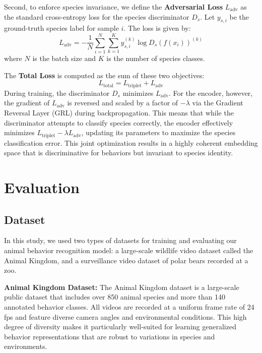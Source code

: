 \documentclass[fleqn,10pt,twocolumn]{AROB}
\begin{document}
Second, to enforce species invariance, we define the \textbf{Adversarial Loss} $L_{\text{adv}}$ as the standard cross-entropy loss for the species discriminator $D_s$.
Let $y_{s,i}$ be the ground-truth species label for sample $i$. The loss is given by:
%
\begin{equation}
L_{\text{adv}} = - \frac{1}{N} \sum_{i=1}^{N} \sum_{k=1}^{K} y_{s,i}^{(k)} \log D_s(f(x_i))^{(k)}
\end{equation}
%
where $N$ is the batch size and $K$ is the number of species classes.

The \textbf{Total Loss} is computed as the sum of these two objectives:
%
\begin{equation}
L_{\text{total}} = L_{\text{triplet}} + L_{\text{adv}}
\end{equation}
%
During training, the discriminator $D_s$ minimizes $L_{\text{adv}}$. For the encoder, however, the gradient of $L_{\text{adv}}$ is reversed and scaled by a factor of $-\lambda$ via the Gradient Reversal Layer (GRL) during backpropagation.
This means that while the discriminator attempts to classify species correctly, the encoder effectively minimizes $L_{\text{triplet}} - \lambda L_{\text{adv}}$, updating its parameters to maximize the species classification error.
This joint optimization results in a highly coherent embedding space that is discriminative for behaviors but invariant to species identity.


\section{Evaluation}\label{sec:evaluation}
\subsection{Dataset}
In this study, we used two types of datasets for training and evaluating our animal behavior recognition model: a large-scale wildlife video dataset called the Animal Kingdom, and a surveillance video dataset of polar bears recorded at a zoo.

\textbf{Animal Kingdom Dataset:}
The Animal Kingdom dataset is a large-scale public dataset that includes over 850 animal species and more than 140 annotated behavior classes. All videos are recorded at a uniform frame rate of 24 fps and feature diverse camera angles and environmental conditions. This high degree of diversity makes it particularly well-suited for learning generalized behavior representations that are robust to variations in species and environments.
\end{document}
